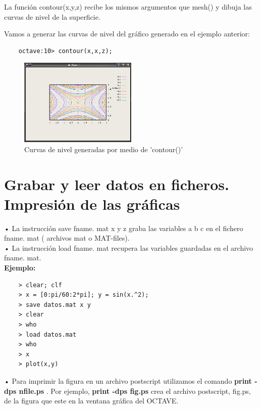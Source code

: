 \documentclass[a4,12pt]{article}
\begin{document}
La función contour(x,y,z) recibe los mismos argumentos que mesh() y dibuja las curvas de nivel de la superficie.

Vamos a generar las curvas de nivel del gráfico generado en el ejemplo anterior:

\begin{verbatim}
	octave:10> contour(x,x,z);
\end{verbatim}
\begin{figure}[H]
  \centering
    \includegraphics[width=0.5\textwidth]{graficos/imagen6}
  \caption{Curvas de nivel generadas por medio de 'contour()'}
\end{figure}

\section{Grabar y leer datos en ficheros. Impresión de las gráficas}

• La instrucción save fname. mat x y z graba las variables a b c en el fichero fname. mat ( archivos mat o MAT-files).\\
• La instrucción load fname. mat recupera las variables guardadas en el archivo fname. mat.\\
\smallskip
\textbf{Ejemplo:}\\
\begin{verbatim}
    > clear; clf
    > x = [0:pi/60:2*pi]; y = sin(x.^2);
    > save datos.mat x y
    > clear
    > who
    > load datos.mat
    > who
    > x
    > plot(x,y)
\end{verbatim}
• Para imprimir la figura en un archivo postscript utilizamos el comando \textbf{print -dps nfile.ps} . Por ejemplo, \textbf{print -dps fig.ps} crea el archivo postscript, fig.ps, de la figura que este en la ventana gráfica del OCTAVE.
\end{document}
